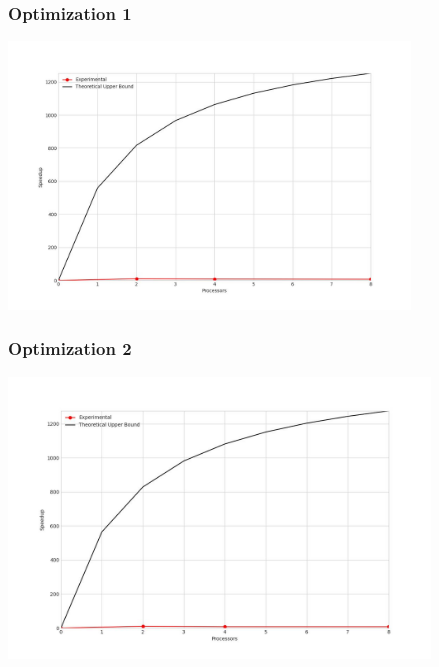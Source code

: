 \subsubsection{Optimization 1}
\begin{center}
    \resizebox{0.95\textwidth}{!}{}
    \includegraphics[width=0.8\textwidth]{../img/speedup-graph_type-tile-205000-O1}
\end{center}

\clearpage
\subsubsection{Optimization 2}
\begin{center}
    \resizebox{0.95\textwidth}{!}{}
    \includegraphics[width=0.84\textwidth]{../img/speedup-graph_type-tile-205000-O2}
\end{center}


